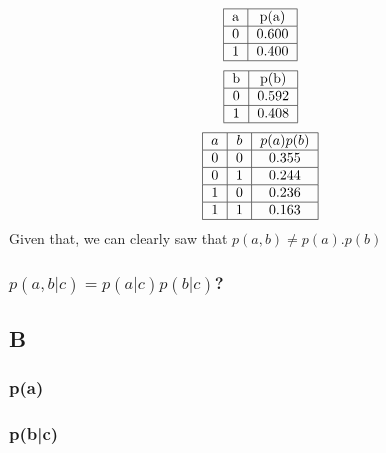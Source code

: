 \documentclass{article}
\begin{document}
                \[
                    \begin{tabular}{|c|c|}
                        \hline
                        a&p(a)\\
                        \hline
                        0&0.600\\
                        \hline
                        1&0.400\\
                        \hline
                    \end{tabular}
                \]
                \[
                    \begin{tabular}{|c|c|}
                        \hline
                        b&p(b)\\
                        \hline
                        0&0.592\\
                        \hline
                        1&0.408\\
                        \hline
                    \end{tabular}
                \]
                \[
                    \begin{tabular}{|c|c|c|}
                        \hline
                        $a$&$b$&$p(a)p(b)$\\
                        \hline
                        0&0&0.355\\
                        \hline
                        0&1&0.244\\
                        \hline
                        1&0&0.236\\
                        \hline
                        1&1&0.163\\
                        \hline
                    \end{tabular}
                \]
                Given that, we can clearly saw that $p(a, b)\ne p(a).p(b)$
            \subsubsection{$p(a,b|c)=p(a|c)p(b|c)$?}
        \subsection{B}
            \subsubsection{p(a)}
            \subsubsection{p(b|c)}
\end{document}
